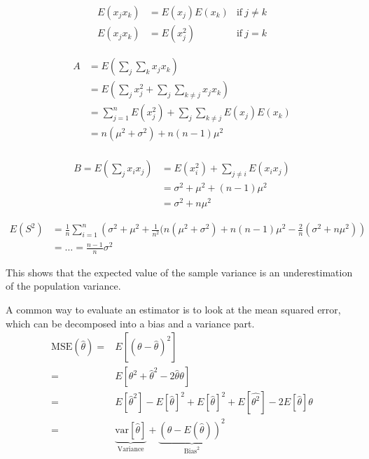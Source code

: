 \begin{align}
  E(x_{j}x_{k})&=E(x_{j})E(x_{k})   &\text{if} \ j \neq k\\
  E(x_{j}x_{k})&=E(x_{j}^2)         &\text{if} \ j = k
\end{align}
    
\begin{align}
A &= E\left(\sum_{j}\sum_{k}x_{j}x_{k}\right) \\
  &= E\left( \sum_{j}x_{j}^2+\sum_{j}\sum_{k \neq j}x_{j}x_{k} \right)\\
  &= \sum_{j=1}^{n}E(x_{j}^2)+\sum_{j}\sum_{k \neq j}E(x_{j})E(x_{k})\\
  &= n(\mu^2 + \sigma^2) + n(n-1)\mu^2\\
\end{align}

\begin{align}
  B = E\left(\sum_{j}x_{i}x_{j}\right) &= E(x_{i}^2)+\sum_{j \neq i}E(x_{i}x_{j})\\
                        &= \sigma^2 + \mu^2 + (n-1)\mu^2 \\
                        &= \sigma^2 + n\mu^2
\end{align}

\begin{align}
    E(S^2) &= \frac{1}{n}\sum_{i=1}^{n}\left(\sigma^2 + \mu^2+ \frac{1}{n^2}(n(\mu^2+\sigma^2)+n(n-1)\mu^2-\frac{2}{n}(\sigma^2+n\mu^2)\right)\\
           &= \hdots = \frac{n-1}{n}\sigma^2
\end{align}

This shows that the expected value of the sample variance is an underestimation of the population variance.

A common way to evaluate an estimator is to look at the mean squared error, which can be decomposed into a bias and a variance part.
\begin{align}
  \text{MSE}(\hat{\theta}) =& E[(\theta-\hat{\theta})^2]\\
                           =& E[\theta^2 + \hat{\theta}^2 - 2\hat{\theta}\theta]\\
                           =& E[\hat{\theta}^2]-E[\hat{\theta}]^2 + E[\hat{\theta}]^2 + E[\hat{\theta^2}] -2E[\hat{\theta}]\theta\\
                           =& \underbrace{\text{var}[\hat{\theta}]}_{\text{Variance}} + \underbrace{(\theta-E(\hat{\theta}))^2}_{\text{Bias}^2}\\
\end{align}

